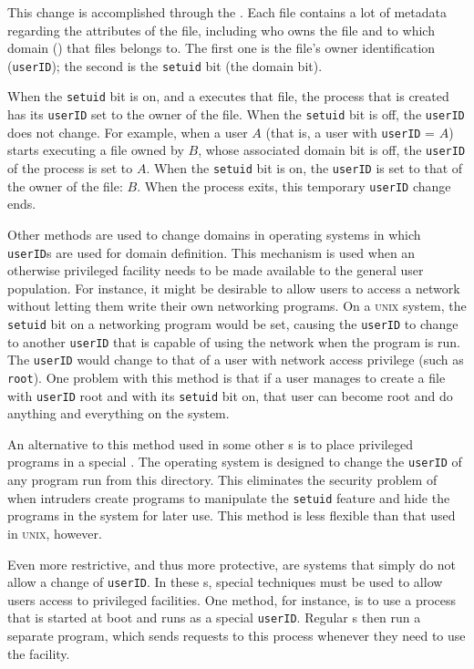 This change is accomplished through the .
Each file contains a lot of metadata regarding the attributes of the file, including who owns the file and to which domain () that files belongs to.
The first one is the file's owner identification (\texttt{userID}); the second is the \texttt{setuid} bit (the domain bit).

When the \texttt{setuid} bit is on, and a  executes that file, the process that is created has its \texttt{userID} set to the owner of the file.
When the \texttt{setuid} bit is off, the \texttt{userID} does not change.
For example, when a user $A$ (that is, a user with \texttt{userID} = $A$) starts executing a file owned by $B$, whose associated domain bit is off, the \texttt{userID} of the process is set to $A$.
When the \texttt{setuid} bit is on, the \texttt{userID} is set to that of the owner of the file: $B$.
When the process exits, this temporary \texttt{userID} change ends.

Other methods are used to change domains in operating systems in which \texttt{userID}s are used for domain definition.
This mechanism is used when an otherwise privileged facility needs to be made available to the general user population.
For instance, it might be desirable to allow users to access a network without letting them write their own networking programs.
On a \textsc{unix} system, the \texttt{setuid} bit on a networking program would be set, causing the \texttt{userID} to change to another \texttt{userID} that is capable of using the network when the program is run.
The \texttt{userID} would change to that of a user with network access privilege (such as \texttt{root}).
One problem with this method is that if a user manages to create a file with \texttt{userID} root and with its \texttt{setuid} bit on, that user can become root and do anything and everything on the system.

An alternative to this method used in some other s is to place privileged programs in a special .
The operating system is designed to change the \texttt{userID} of any program run from this directory.
This eliminates the security problem of when intruders create programs to manipulate the \texttt{setuid} feature and hide the programs in the system for later use.
This method is less flexible than that used in \textsc{unix}, however.

Even more restrictive, and thus more protective, are systems that simply do not allow a change of \texttt{userID}.
In these s, special techniques must be used to allow users access to privileged facilities.
One method, for instance, is to use a  process that is started at boot and runs as a special \texttt{userID}.
Regular s then run a separate program, which sends requests to this process whenever they need to use the facility.

